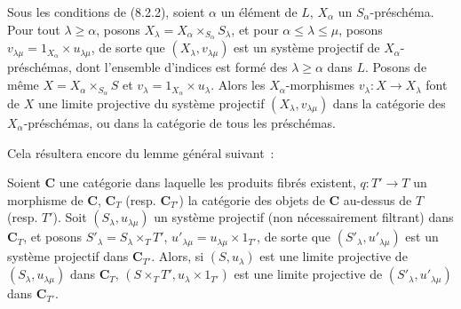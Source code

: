 \begin{proposition}[8.2.5]
\label{IV.8.2.5-fr}
Sous les conditions de \textup{(8.2.2)}, soient $\alpha$ un élément de $L$,
$X_\alpha$ un $S_\alpha$-préschéma. Pour tout $\lambda\geq\alpha$, posons
$X_\lambda=X_\alpha\times_{S_\alpha}S_\lambda$, et pour
$\alpha\leq\lambda\leq\mu$, posons
$v_{\lambda\mu}=1_{X_\alpha}\times u_{\lambda\mu}$, de sorte que
$(X_\lambda,v_{\lambda\mu})$ est un système projectif de
$X_\alpha$-préschémas, dont l'ensemble d'indices est formé des
$\lambda\geq\alpha$ dans $L$. Posons de même
$X=X_\alpha\times_{S_\alpha}S$ et $v_\lambda=1_{X_\alpha}\times u_\lambda$.
Alors les $X_\alpha$-morphismes $v_\lambda:X\to X_\lambda$ font de $X$ une
limite projective du système projectif $(X_\lambda,v_{\lambda\mu})$ dans la
catégorie des $X_\alpha$-préschémas, ou dans la catégorie de tous les
préschémas.
\end{proposition}

Cela résultera encore du lemme général suivant~:

\begin{lemma}[8.2.6]
\label{IV.8.2.6-fr}
Soient $\boldsymbol{C}$ une catégorie dans laquelle les produits fibrés existent,
$q:T'\to T$ un morphisme de $\boldsymbol{C}$, $\boldsymbol{C}_T$ (\textup{resp.}
$\boldsymbol{C}_{T'}$) la catégorie des objets de $\boldsymbol{C}$ au-dessus
de $T$ \textup{(resp. $T'$)}. Soit $(S_\lambda,u_{\lambda\mu})$ un système projectif
(non nécessairement filtrant) dans $\boldsymbol{C}_T$, et posons
$S'_\lambda=S_\lambda\times_T T'$,
$u'_{\lambda\mu}=u_{\lambda\mu}\times 1_{T'}$, de sorte que
$(S'_\lambda,u'_{\lambda\mu})$ est un système projectif dans
$\boldsymbol{C}_{T'}$. Alors, si $(S,u_\lambda)$ est une limite projective de
$(S_\lambda,u_{\lambda\mu})$ dans $\boldsymbol{C}_T$,
$(S\times_T T',u_\lambda\times 1_{T'})$ est une limite projective de
$(S'_\lambda,u'_{\lambda\mu})$ dans $\boldsymbol{C}_{T'}$.
\end{lemma}

